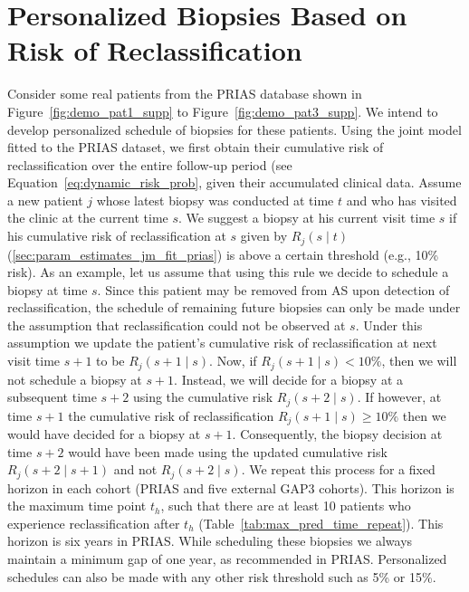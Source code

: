 \section{Personalized Biopsies Based on Risk of Reclassification}
Consider some real patients from the PRIAS database shown in Figure~\ref{fig:demo_pat1_supp} to Figure~\ref{fig:demo_pat3_supp}. We intend to develop personalized schedule of biopsies for these patients. Using the joint model fitted to the PRIAS dataset, we first obtain their cumulative risk of reclassification over the entire follow-up period (see Equation~\ref{eq:dynamic_risk_prob}, given their accumulated clinical data. Assume a new patient $j$ whose latest biopsy was conducted at time $t$ and who has visited the clinic at the current time $s$. We suggest a biopsy at his current visit time $s$ if his cumulative risk of reclassification at $s$ given by $R_j(s \mid t)$ (\ref{sec:param_estimates_jm_fit_prias}) is above a certain threshold (e.g., 10\% risk). As an example, let us assume that using this rule we decide to schedule a biopsy at time $s$. Since this patient may be removed from AS upon detection of reclassification, the schedule of remaining future biopsies can only be made under the assumption that reclassification could not be observed at $s$. Under this assumption we update the patient's cumulative risk of reclassification at next visit time $s+1$ to be $R_j(s + 1 \mid s)$. Now, if $R_j(s + 1 \mid s) < 10\%$, then we will not schedule a biopsy at $s+1$. Instead, we will decide for a biopsy at a subsequent time $s + 2$ using the cumulative risk $R_j(s + 2 \mid s)$. If however, at time $s+1$ the cumulative risk of reclassification $R_j(s + 1 \mid s) \geq 10\%$ then we would have decided for a biopsy at $s+1$. Consequently, the biopsy decision at time $s + 2$ would have been made using the updated cumulative risk $R_j(s + 2 \mid s + 1)$ and not $R_j(s + 2 \mid s)$. We repeat this process for a fixed horizon in each cohort (PRIAS and five external GAP3 cohorts). This horizon is the maximum time point $t_h$, such that there are at least 10 patients who experience reclassification after $t_h$ (Table~\ref{tab:max_pred_time_repeat}). This horizon is six years in PRIAS. While scheduling these biopsies we always maintain a minimum gap of one year, as recommended in PRIAS. Personalized schedules can also be made with any other risk threshold such as 5\% or 15\%.

